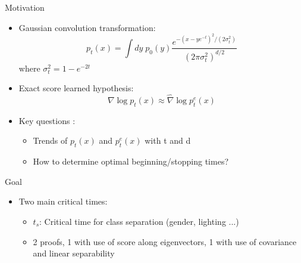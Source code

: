 \documentclass[aspectratio=169]{beamer}
\begin{document}
\begin{frame}{Motivation}
    \begin{itemize}
        
        \item Gaussian convolution transformation:
        \begin{equation}
            p_t(x) = \int dy \; p_0(y) \frac{e^{-(x-ye^{-t})^2/(2\sigma_t^2)}}{(2\pi\sigma_t^2)^{d/2}}
        \end{equation}
        where $\sigma_t^2 = 1-e^{-2t}$

        \item Exact score learned hypothesis:
        \begin{equation}
            \nabla \log p_t(x) \approx \hat{\nabla} \log p_t^e(x)
        \end{equation}

        \item Key questions :
        \begin{itemize}
            \item Trends of $p_t(x)$ and $p_t^e(x)$ with t and d
            \item How to determine optimal beginning/stopping times?
        \end{itemize}
    \end{itemize}
\end{frame}



\begin{frame}{Goal}
    \begin{itemize}
        \item Two main critical times:
        \begin{itemize}
            \item $t_s$: Critical time for class separation (gender, lighting ...)
            \item 2 proofs, 1 with use of score along eigenvectors, 1 with use of covariance and linear separability
        \end{itemize}
        



        \begin{center}
        \end{center}
        




    \end{itemize}
\end{frame}
\end{document}
